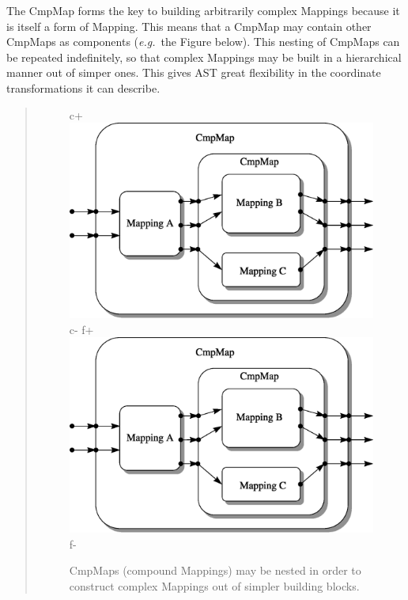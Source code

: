 \documentclass[twoside,11pt]{article}
\begin{document}
\begin{htmlonly}
   The CmpMap forms the key to building arbitrarily complex Mappings
   because it is itself a form of Mapping. This means that a CmpMap may
   contain other CmpMaps as components ({\em{e.g.}}\ the Figure
   below). This nesting of CmpMaps can be repeated indefinitely, so that
   complex Mappings may be built in a hierarchical manner out of simper
   ones.  This gives AST great flexibility in the coordinate
   transformations it can describe.
   \begin{quote}
   \begin{figure}
   \label{fig:complexcmpmap}
c+
   \includegraphics[scale=0.8]{sun211_figures/complex.eps}
c-
f+
   \includegraphics[scale=0.8]{sun210_figures/complex.eps}
f-
   \caption{CmpMaps (compound Mappings) may be nested in order to
   construct complex Mappings out of simpler building blocks.}
   \end{figure}
   \end{quote}
\end{htmlonly}
\end{document}
